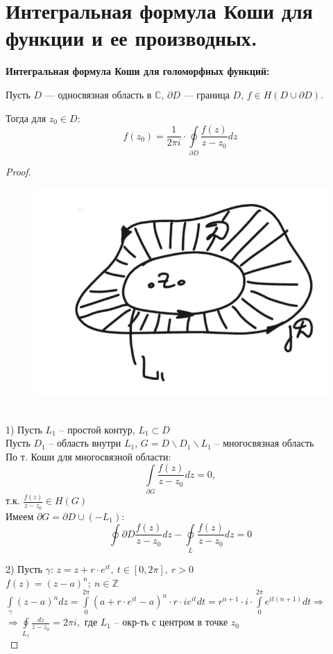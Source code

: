 \newpage
\section{Интегральная формула Коши для функции и ее производных.}


\textbf{Интегральная формула Коши для голоморфных функций:}

Пусть $D$ --- односвязная область в $\mathbb{C}$, $\partial D$ --- граница $D$, $f\in H(D\cup \partial D).$

Тогда для $z_0 \in D$:
$$f(z_0)=\frac{1}{2\pi i} \cdot \oint\limits_{\partial D} \frac{f(z)}{z-z_0}dz$$

\begin{proof}
    \ \\
    \begin{figure}[!ht]
        \includegraphics[scale=0.6]{answers/img/ans9.png}
    \end{figure}\\
    1) Пусть $L_1$ -- простой контур, $L_1 \subset D$\\
    Пусть $D_1$ -- область внутри $L_1$, $G=D\backslash D_1\backslash L_1$ -- многосвязная область\\
    По т. Коши для многосвязной области:
    $$\int\limits_{\partial G}\frac{f(z)}{z-z_0}dz=0,$$
    т.к. $\frac{f(z)}{z-z_0} \in H(G)$\\
    Имеем $\partial G = \partial D \cup (-L_1)$:\\
    $$\oint\limits{\partial D}\frac{f(z)}{z-z_0}dz-\oint\limits_{L}\frac{f(z)}{z-z_0}dz=0$$

    2) Пусть $\gamma: \, z=z+r\cdot e^{it}, \ t\in[0, 2\pi], \ r>0$\\
    $f(z)=(z-a)^n; \ n\in \mathbb{Z}$\\
    $\int\limits_{\gamma}(z-a)^n dz = \int\limits_0^{2\pi} (a+r\cdot e^{it}-a)^n\cdot r\cdot ie^{it}dt = r^{n+1}\cdot i \cdot \int\limits_0^{2\pi} e^{it(n+1)}dt \Rightarrow$\\
    $\Rightarrow \oint\limits_{L_1}\frac{dz}{z-z_0} = 2\pi i,$
    где $L_1$ -- окр-ть с центром в точке $z_0$\\


\end{proof}
